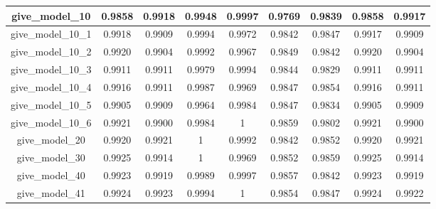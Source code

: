\begin{table}[!h]
\begin{tabular} {|c|c|c|c|c|c|c|c|c| }
        give\_model\_10                   & 0.9858                        & 0.9918                         & 0.9948                      & 0.9997                  & 0.9769 & 0.9839 & 0.9858 & 0.9917 \\ \hline
        give\_model\_10\_1                & 0.9918                        & 0.9909                         & 0.9994                      & 0.9972                  & 0.9842 & 0.9847 & 0.9917 & 0.9909 \\ \hline
        give\_model\_10\_2                & 0.9920                        & 0.9904                         & 0.9992                      & 0.9967                  & 0.9849 & 0.9842 & 0.9920 & 0.9904 \\ \hline
        give\_model\_10\_3                & 0.9911                        & 0.9911                         & 0.9979                      & 0.9994                  & 0.9844 & 0.9829 & 0.9911 & 0.9911 \\ \hline
        give\_model\_10\_4                & 0.9916                        & 0.9911                         & 0.9987                      & 0.9969                  & 0.9847 & 0.9854 & 0.9916 & 0.9911 \\ \hline
        give\_model\_10\_5                & 0.9905                        & 0.9909                         & 0.9964                      & 0.9984                  & 0.9847 & 0.9834 & 0.9905 & 0.9909 \\ \hline
        give\_model\_10\_6                & 0.9921                        & 0.9900                         & 0.9984                      & 1                       & 0.9859 & 0.9802 & 0.9921 & 0.9900 \\ \hline
        give\_model\_20                   & 0.9920                        & 0.9921                         & 1                           & 0.9992                  & 0.9842 & 0.9852 & 0.9920 & 0.9921 \\ \hline
        give\_model\_30                   & 0.9925                        & 0.9914                         & 1                           & 0.9969                  & 0.9852 & 0.9859 & 0.9925 & 0.9914 \\ \hline
        give\_model\_40                   & 0.9923                        & 0.9919                         & 0.9989                      & 0.9997                  & 0.9857 & 0.9842 & 0.9923 & 0.9919 \\ \hline
        give\_model\_41                   & 0.9924                        & 0.9923                         & 0.9994                      & 1                       & 0.9854 & 0.9847 & 0.9924 & 0.9922 \\ \hline

\end{tabular}
\end{table}

